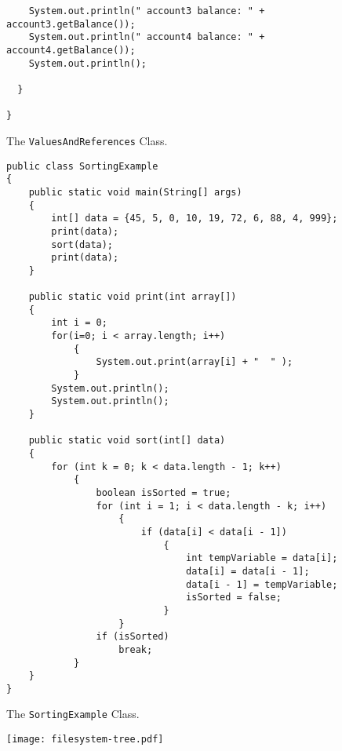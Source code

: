 \documentclass[12pt]{article}
\begin{document}
\begin{enumerate}
\begin{figure}[t]
{\begin{verbatim}
    System.out.println(" account3 balance: " + account3.getBalance());
    System.out.println(" account4 balance: " + account4.getBalance());
    System.out.println();

  }

}
\end{verbatim}
}

\caption{The {\tt ValuesAndReferences} Class.}
\label{ValuesAndReferences}
\end{figure}

\begin{figure}[t]

\footnotesize{
\begin{verbatim}
public class SortingExample
{
    public static void main(String[] args)
    {
        int[] data = {45, 5, 0, 10, 19, 72, 6, 88, 4, 999};
        print(data);
        sort(data);
        print(data);
    }

    public static void print(int array[])
    {
        int i = 0;
        for(i=0; i < array.length; i++)
            {
                System.out.print(array[i] + "  " );
            }
        System.out.println();
        System.out.println();
    }

    public static void sort(int[] data)
    {
        for (int k = 0; k < data.length - 1; k++)
            {
                boolean isSorted = true;
                for (int i = 1; i < data.length - k; i++)
                    {
                        if (data[i] < data[i - 1])
                            {
                                int tempVariable = data[i];
                                data[i] = data[i - 1];
                                data[i - 1] = tempVariable;
                                isSorted = false;
                            }
                    }
                if (isSorted)
                    break;
            }
    }
}
\end{verbatim}
}

\caption{The {\tt SortingExample} Class.}
\label{SortingExample}
\end{figure}

\newpage

\begin{figure}[h]

  \begin{center}
  \texttt{[image: filesystem-tree.pdf]}
  \end{center}

  \vspace*{-.2in}


\end{figure}
\end{enumerate}
\end{document}
